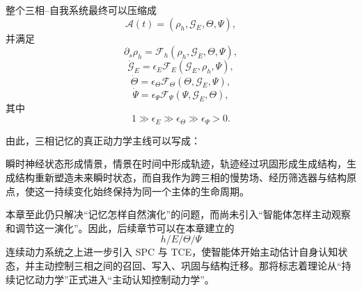 整个三相--自我系统最终可以压缩成
\[
\boxed{
\mathcal{A}(t)
=
\left(
\rho_h,
\mathcal{G}_E,
\Theta,
\Psi
\right),
}
\]
并满足
\[
\partial_s\rho_h
=
\mathcal{F}_h
\left(
\rho_h,\mathcal{G}_E,\Theta,\Psi
\right),
\]
\[
\dot{\mathcal{G}}_E
=
\epsilon_E
\mathcal{F}_E
\left(
\mathcal{G}_E,\rho_h,\Psi
\right),
\]
\[
\dot\Theta
=
\epsilon_\Theta
\mathcal{F}_\Theta
\left(
\Theta,\mathcal{G}_E,\Psi
\right),
\]
\[
\dot\Psi
=
\epsilon_\Psi
\mathcal{F}_\Psi
\left(
\Psi,\mathcal{G}_E,\Theta
\right),
\]
其中
\[
1
\gg
\epsilon_E
\gg
\epsilon_\Theta
\gg
\epsilon_\Psi
>
0.
\]

由此，三相记忆的真正动力学主线可以写成：
\begin{statementbox}
瞬时神经状态形成情景，情景在时间中形成轨迹，轨迹经过巩固形成生成结构，生成结构重新塑造未来瞬时状态，而自我作为跨三相的慢势场、经历筛选器与结构原点，使这一持续变化始终保持为同一个主体的生命周期。
\end{statementbox}

本章至此仍只解决“记忆怎样自然演化”的问题，而尚未引入“智能体怎样主动观察和调节这一演化”。因此，后续章节可以在本章建立的
\[
h/E/\Theta/\Psi
\]
连续动力系统之上进一步引入 SPC 与 TCE，使智能体开始主动估计自身认知状态，并主动控制三相之间的召回、写入、巩固与结构迁移。那将标志着理论从“持续记忆动力学”正式进入“主动认知控制动力学”。
